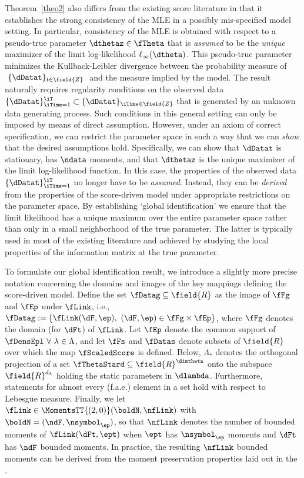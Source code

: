 Theorem~\ref{theo2} also differs from the existing score literature in that it establishes the strong consistency of the MLE in a possibly mis-specified model setting. In particular, consistency of the MLE is obtained with respect to a pseudo-true parameter $\dthetaz \in \fTheta$ that
is \textit{assumed} to be the \textit{unique} maximizer of the limit log-likelihood
$\ell_{\infty}(\dtheta)$. This pseudo-true parameter minimizes the
Kullback-Leibler divergence between the probability measure of $ \ \{\dDatat\}_{t \in \field{Z}} \ $
and the measure implied by the model. 
The result naturally requires regularity conditions on the observed data
$\{\dDatat\}_{\iTime=1}^{\iT} \subset \{\dDatat\}_{\iTime \in \field{Z}}$ that is generated by an unknown data generating process.
Such conditions in this general setting can only be imposed by means of direct assumption. 
However, under an axiom of correct specification, we can restrict the parameter space in such a way that we can \textit{show} that the desired assumptions hold. Specifically, we can show that $\dDatat$ is stationary,  has $\ndata$ moments, and  that $\dthetaz$ is the unique maximizer of the limit log-likelihood function. In this case, the properties of the observed data $\{\dDatat\}_{\iTime=1}^{\iT}$ no longer have to be \textit{assumed}. Instead, they can be \textit{derived} from the properties of the score-driven model under appropriate restrictions on the parameter space. 
By establishing `global identification' we ensure that the limit likelihood has a unique maximum over the entire parameter space rather than only in a small neighborhood of the true parameter. The latter 
is typically used in most of the existing literature and achieved by studying the local properties of the information matrix at the true parameter.

To formulate our global identification result, we introduce a slightly more precise notation concerning the domains and images of the key mappings defining the score-driven model. Define the set  $\fDatag \subseteq \field{R}$ as the image of $\fFg$ and $\fEp$ under $\fLink$, i.e., $\fDatag:=\{\fLink(\dF,\ep), \ (\dF,\ep) \in\fFg \times \fEp\}$, where $\fFg$ denotes the domain (for $\dFt$) of $\fLink$. 
Let $\fEp$ denote the common support of $\fDensEpl \ \forall \ \lambda \in \Lambda$, and let $\fFs$ and $\fDatas$  denote subsets of $\field{R}$ over which the map $\fScaledScore$ is defined.  Below, $\Lambda_{*}$ denotes the orthogonal projection of a set $\fThetaStard \subseteq \field{R}^{\dimtheta}$ onto the subspace $\field{R}^{d_{\lambda}}$ holding the static parameters in $\dlambda$. Furthermore, statements for almost every (f.a.e.) element in a set hold with respect to Lebesgue measure. 
Finally, we let $\fLink \in \MomentsTT{(2,0)}(\boldN,\nfLink)$ with $\boldN=(\ndF,\nsymbol_\ep)$, so that $\nfLink$ denotes the number of bounded moments of $\fLink(\dFt,\ept)$ when $\ept$ has $\nsymbol_\ep$ moments and $\dFt$ has $\ndF$ bounded moments. In practice, the resulting $\nfLink$ bounded moments can be derived from the moment preservation properties laid out in the \SupplementaryAppendix.

